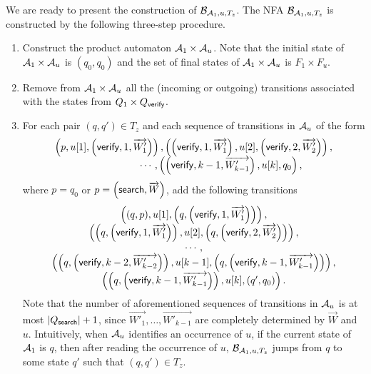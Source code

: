 We are ready to present the construction of $\mathcal{B}_{\mathcal{A}_1, u,  T_{z}}$. The NFA $\mathcal{B}_{\mathcal{A}_1, u, T_{z}}$ is constructed by the following three-step procedure.
\begin{enumerate}
\item Construct the product automaton $\mathcal{A}_1 \times \mathcal{A}_u$. Note that the initial state of $\mathcal{A}_1 \times \mathcal{A}_u$ is $(q_{0},q_0)$ and the set of final states of $\mathcal{A}_1 \times \mathcal{A}_u$ is $F_1 \times F_u$.

\item Remove from $\mathcal{A}_1 \times \mathcal{A}_u$ all the (incoming or outgoing) transitions associated with the states from $Q_1 \times Q_{\mathsf{verify}}$.

\item For each pair $(q,q') \in T_{z}$ and each sequence of transitions in $\mathcal{A}_u$ of the form
$$
\begin{array}{l}
\left(p, u[1], \left(\verify, 1, \overrightarrow{W'_1} \right) \right), \left( \left(\verify, 1, \overrightarrow{W'_1} \right), u[2],
 \left(\verify, 2, \overrightarrow{W'_2}\right) \right), \\
 \hspace{3cm} \cdots, \left(\left(\verify, k-1, \overrightarrow{W'_{k-1}} \right), u[k], q_0\right),
\end{array}
$$
where  $p=q_0$ or $p = \left(\mathsf{search}, \overrightarrow{W} \right)$,
add the following transitions
$$
\begin{array}{c}
\left((q,p), u[1], \left(q, \left(\mathsf{verify}, 1, \overrightarrow{W'_1} \right) \right) \right), \\
\left( \left(q, \left(\mathsf{verify}, 1, \overrightarrow{W'_1} \right) \right), u[2], \left(q, \left(\mathsf{verify}, 2, \overrightarrow{W'_2}\right)\right)\right),  \\
\cdots, \\
\left(\left(q, \left(\mathsf{verify}, k-2, \overrightarrow{W'_{k-2}} \right) \right), u[k-1], \left (q, \left (\mathsf{verify}, k-1, \overrightarrow{W'_{k-1}} \right) \right) \right),\\ \left( \left(q, \left (\mathsf{verify}, k-1, \overrightarrow{W'_{k-1}} \right) \right), u[k], \left(q', q_0 \right)\right).
\end{array}
$$
Note that the number of aforementioned sequences of transitions in $\mathcal{A}_u$ is at most $|Q_{\mathsf{search}}|+1$, since  $ \overrightarrow{W'_1},\dots,  \overrightarrow{W'_{k-1}}$ are completely determined by $\overrightarrow{W} $ and $u$.
Intuitively, when $\mathcal{A}_u$ identifies an occurrence of $u$, if the current state of $\mathcal{A}_1$ is $q$, then after reading the occurrence of $u$, $\mathcal{B}_{\mathcal{A}_1, u, T_z}$ jumps from $q$ to some state $q'$ such that $(q,q') \in T_z$.
\end{enumerate}

